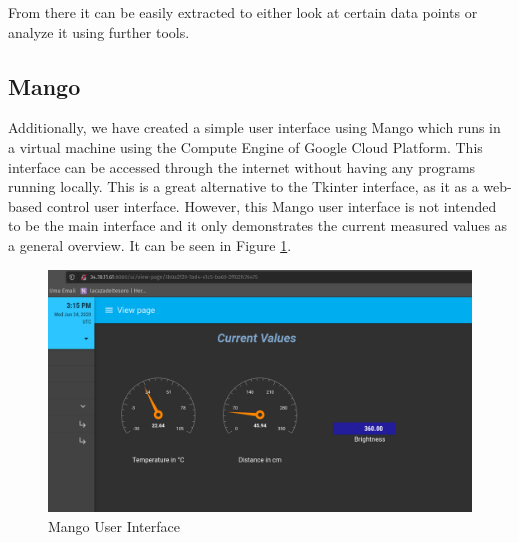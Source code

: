 \documentclass{article}
\begin{document}
From there it can be easily extracted to either look at certain data points or analyze it using further tools.
\subsection{Mango}
Additionally, we have created a simple user interface using Mango which runs in a virtual machine using the Compute Engine of Google Cloud Platform. This interface can be accessed through the internet without having any programs running locally. This is a great alternative to the Tkinter interface, as it as a web-based control user interface. However, this Mango user interface is not intended to be the main interface and it only demonstrates the current measured values as a general overview. It can be seen in Figure \ref{fig:mango}.
\begin{figure}
\centering
\includegraphics[scale=0.35]{mango.png}
\caption{Mango User Interface}
\label{fig:mango}
\end{figure}
\end{document}
